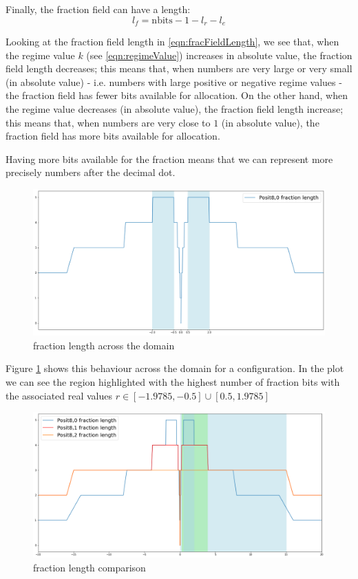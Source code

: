 Finally, the fraction field can have a length:
\begin{equation}\label{eqn:fracFieldLength}
l_f = \text{nbits} - 1 - l_r - l_e
\end{equation}

Looking at the fraction field length in \eqref{eqn:fracFieldLength}, we see that, when the regime value $k$ (see \eqref{eqn:regimeValue}) increases in absolute value, the fraction field length decreases; this means that, when numbers are very large or very small (in absolute value) - i.e. numbers with large positive or negative regime values - the fraction field has fewer bits available for allocation. On the other hand, when the regime value decreases (in absolute value), the fraction field length increase; this means that, when numbers are very close to $1$ (in absolute value), the fraction field has more bits available for allocation. 

Having more bits available for the fraction means that we can represent more precisely numbers after the decimal dot.

\begin{figure}
    \centering
    \includegraphics[width=\linewidth]{img/posit80fractionsWithZoom.png}
    \caption{ fraction length across the domain}
    \label{fig:posit80Fractions}
\end{figure}

Figure \ref{fig:posit80Fractions} shows this behaviour across the domain for a  configuration. In the plot we can see the region highlighted with the highest number of fraction bits with the associated real values $r \in [-1.9785,-0.5] \cup [0.5,1.9785]$


\begin{figure}
    \centering
    \includegraphics[width=\linewidth]{img/posit8xFractions.png}
    \caption{ fraction length comparison}
    \label{fig:posit8xFractions}
\end{figure}

